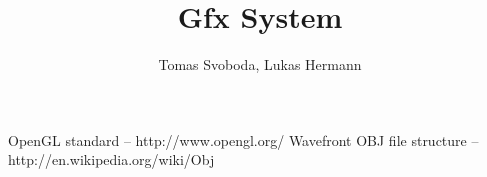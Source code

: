 \documentclass[12pt, a4paper]{article}
\begin{document}
\title{Gfx System}
\author{Tomas Svoboda, Lukas Hermann}
\maketitle

\tableofcontents

\newpage



\begin{thebibliography}{9}
 OpenGL standard -- http://www.opengl.org/
Wavefront OBJ file structure -- http://en.wikipedia.org/wiki/Obj
\end{thebibliography}
\end{document}

